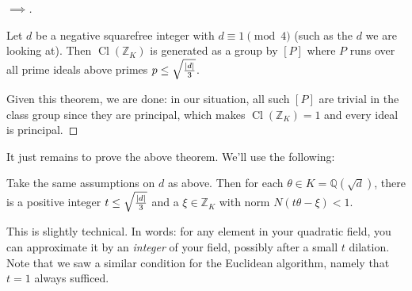 \begin{proof}[$\implies$]
\begin{theorem}
Let \(d\) be a negative squarefree integer with \(d \equiv 1 \pmod 4\)
(such as the \(d\) we are looking at). Then
\(\operatorname{Cl}({\mathbb{Z}}_K)\) is generated as a group by \([P]\)
where \(P\) runs over all prime ideals above primes
\(p \leq \sqrt{{\left\lvert {d} \right\rvert}\over 3 }\).

\end{theorem}

Given this theorem, we are done: in our situation, all such \([P]\) are
trivial in the class group since they are principal, which makes
\(\operatorname{Cl}({\mathbb{Z}}_K) = 1\) and every ideal is principal.

\end{proof}

\begin{remark}

It just remains to prove the above theorem. We'll use the following:

\end{remark}

\begin{proposition}

Take the same assumptions on \(d\) as above. Then for each
\(\theta \in K = {\mathbb{Q}}( \sqrt{d} )\), there is a positive integer
\(t \leq \sqrt{{\left\lvert {d} \right\rvert}\over 3 }\) and a
\(\xi \in {\mathbb{Z}}_K\) with norm \(N(t\theta - \xi) < 1\).

\end{proposition}

\begin{remark}

This is slightly technical. In words: for any element in your quadratic
field, you can approximate it by an \emph{integer} of your field,
possibly after a small \(t\) dilation. Note that we saw a similar
condition for the Euclidean algorithm, namely that \(t=1\) always
sufficed.

\end{remark}

